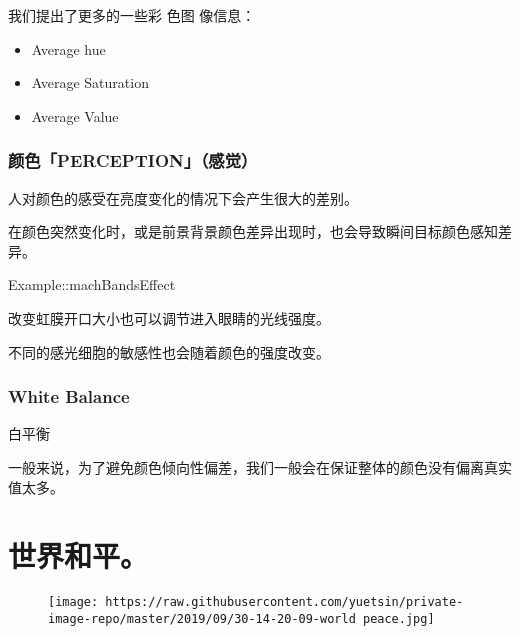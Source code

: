 \documentclass[
]{article}
\begin{document}
我们提出了更多的一些彩 色图 像信息：

\begin{itemize}
\item
  Average hue
\item
  Average Saturation
\item
  Average Value
\end{itemize}

\hypertarget{header-n62}{%
\subsubsection{颜色「PERCEPTION」（感觉）}\label{header-n62}}

人对颜色的感受在亮度变化的情况下会产生很大的差别。

在颜色突然变化时，或是前景背景颜色差异出现时，也会导致瞬间目标颜色感知差异。

Example::machBandsEffect

改变虹膜开口大小也可以调节进入眼睛的光线强度。

不同的感光细胞的敏感性也会随着颜色的强度改变。

\hypertarget{header-n68}{%
\subsubsection{White Balance}\label{header-n68}}

白平衡

一般来说，为了避免颜色倾向性偏差，我们一般会在保证整体的颜色没有偏离真实值太多。

\hypertarget{header-n71}{%
\section{世界和平。}\label{header-n71}}

\begin{figure}
\centering
\texttt{[image: https://raw.githubusercontent.com/yuetsin/private-image-repo/master/2019/09/30-14-20-09-world peace.jpg]}
\caption{}
\end{figure}
\end{document}
